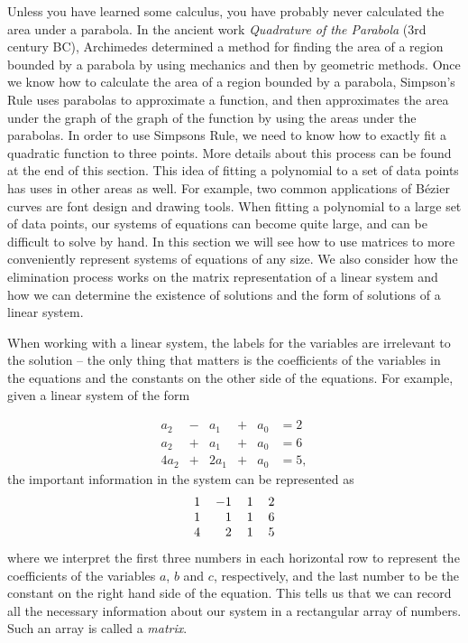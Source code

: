 Unless you have learned some calculus, you have probably never calculated the area under a parabola. In the ancient work \emph{Quadrature of the Parabola} (3rd century BC), Archimedes determined a method for finding the area of a region bounded by a parabola by using mechanics and then by geometric methods. Once we know how to calculate the area of a region bounded by a parabola, Simpson's Rule uses parabolas to approximate a function, and then approximates the area under the graph of the graph of the function by using the areas under the parabolas. In order to use Simpsons Rule, we need to know how to exactly fit a quadratic function to three points. More details about this process can be found at the end of this section. This idea of fitting a polynomial to a set of data points has uses in other areas as well. For example, two common applications of B\'{e}zier curves are font design and drawing tools. When fitting a polynomial to a large set of data points, our systems of equations can become quite large, and can be difficult to solve by hand.  In this section we will see how to use matrices to more conveniently represent systems of equations of any size. We also consider how the elimination process works on the matrix representation of a linear system and how we can determine the existence of solutions and the form of solutions of a linear system.

\label{sec:mtx_lin_intro}

When working with a linear system, the labels for the variables are irrelevant to the solution -- the only thing that matters is the coefficients of the variables in the equations and the constants on the other side of the equations. For example, given a linear system of the form

\begin{equation}  \label{eq:PA_1}
\begin{alignedat}{4}
a_2 	&{}-{} 	&a_1 	&{}+{}	&a_0 &= 2 \\
a_2 	&{}+{} 	&a_1 	&{}+{} 	&a_0 &= 6 \\
4a_2	&{}+{} 	&2a_1 	&{}+{} 	&a_0	&= 5, 
\end{alignedat}
\end{equation}
the important information in the system can be represented as
\[\begin{tabular}{crcc}
1 &$-1$ &1 &2 \\
1 & 1 &1 &6 \\
4 & 2	&1 &5
\end{tabular}\]
where we interpret the first three numbers in each horizontal row to represent the coefficients of the variables $a$, $b$ and $c$, respectively, and the last number to be the constant on the right hand side of the equation. This tells us that we can record all the necessary information about our system in a rectangular array of numbers. Such an array is called a \emph{matrix}.



